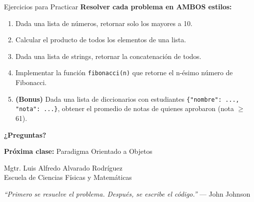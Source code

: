 \documentclass[aspectratio=169]{beamer}
\begin{document}
\begin{frame}{Ejercicios para Practicar}
    \textbf{Resolver cada problema en AMBOS estilos:}
    \vspace{0.5cm}
    
    \begin{enumerate}
        \setlength\itemsep{0.8em}
        \item Dada una lista de números, retornar solo los mayores a 10.
        \item Calcular el producto de todos los elementos de una lista.
        \item Dada una lista de strings, retornar la concatenación de todos.
        \item Implementar la función \texttt{fibonacci(n)} que retorne el n-ésimo número de Fibonacci.
        \item \textbf{(Bonus)} Dada una lista de diccionarios con estudiantes \texttt{\{"nombre": ..., "nota": ...\}}, obtener el promedio de notas de quienes aprobaron (nota $\geq$ 61).
    \end{enumerate}
\end{frame}

\begin{frame}
    \centering
    \Huge \textbf{¿Preguntas?}
    
    \vspace{0.8cm}
    \large
    \textbf{Próxima clase:} Paradigma Orientado a Objetos
    
    \vspace{0.5cm}
    \normalsize
    Mgtr. Luis Alfredo Alvarado Rodríguez\\
    \small Escuela de Ciencias Físicas y Matemáticas
    
    \vspace{0.5cm}
    \footnotesize
    \textit{``Primero se resuelve el problema. Después, se escribe el código.''} — John Johnson
\end{frame}
\end{document}
